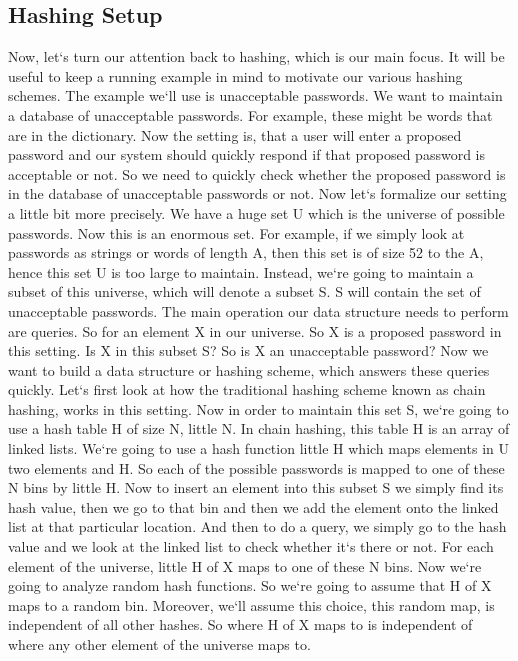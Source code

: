 \subsection{Hashing Setup}
Now, let`s turn our attention back to hashing, which is our main focus.
It will be useful to keep a running example in mind to motivate our various hashing schemes.
The example we`ll use is unacceptable passwords.
We want to maintain a database of unacceptable passwords.
For example, these might be words that are in the dictionary.
Now the setting is, that a user will enter a proposed password and our system should quickly respond if that proposed password is acceptable or not.
So we need to quickly check whether the proposed password is in the database of unacceptable passwords or not.
Now let`s formalize our setting a little bit more precisely.
We have a huge set U which is the universe of possible passwords.
Now this is an enormous set.
For example, if we simply look at passwords as strings or words of length A, then this set is of size 52 to the A, hence this set U is too large to maintain.
Instead, we`re going to maintain a subset of this universe, which will denote a subset S\@.
S will contain the set of unacceptable passwords.
The main operation our data structure needs to perform are queries.
So for an element X in our universe.
So X is a proposed password in this setting.
Is X in this subset S? So is X an unacceptable password? Now we want to build a data structure or hashing scheme, which answers these queries quickly.
Let`s first look at how the traditional hashing scheme known as chain hashing, works in this setting.
Now in order to maintain this set S, we`re going to use a hash table H of size N, little N\@.
In chain hashing, this table H is an array of linked lists.
We`re going to use a hash function little H which maps elements in U two elements and H\@.
So each of the possible passwords is mapped to one of these N bins by little H\@.
Now to insert an element into this subset S we simply find its hash value, then we go to that bin and then we add the element onto the linked list at that particular location.
And then to do a query, we simply go to the hash value and we look at the linked list to check whether it`s there or not.
For each element of the universe, little H of X maps to one of these N bins.
Now we`re going to analyze random hash functions.
So we`re going to assume that H of X maps to a random bin.
Moreover, we`ll assume this choice, this random map, is independent of all other hashes.
So where H of X maps to is independent of where any other element of the universe maps to.
